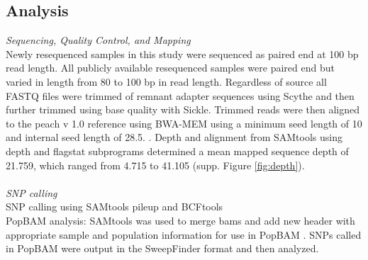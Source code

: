\documentclass[12pt]{article}
\begin{document}
\subsection*{Analysis}
\emph{Sequencing, Quality Control, and Mapping}\\
Newly resequenced samples in this study were sequenced as paired end at 100 bp read length. 
%
All publicly available resequenced samples were paired end but varied in length from 80 to 100 bp in read length. 
%
Regardless of source all FASTQ files were trimmed of remnant adapter sequences using Scythe and then further trimmed using base quality with Sickle. 
%
%
%
Trimmed reads were then aligned to the peach v 1.0 reference using BWA-MEM using a minimum seed length of 10 and internal seed length of 28.5.
%
 \citep{li2013aligning}. 
%
Depth and alignment from SAMtools using depth and flagstat subprograms \citep{li2009sequence} 
determined a mean mapped sequence depth of 21.759, which ranged from 4.715 to 41.105 (supp. Figure \ref{fig:depth}).\\
%
\\
\emph{SNP calling}\\ %
%
SNP calling using SAMtools pileup and BCFtools \citep{li2009sequence} \\
%
PopBAM analysis: SAMtools was used to merge bams and add new header \citep{li2009sequence} with appropriate sample and population information for use in PopBAM \citep{garrigan2013popbam}. SNPs called in PopBAM were output in the SweepFinder \citep{nielsen2005genomic} format and then analyzed.\\
\end{document}
